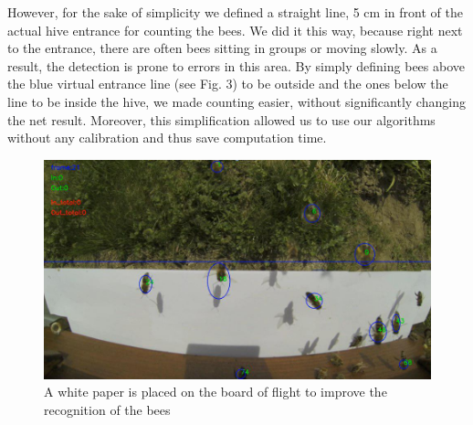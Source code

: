 \documentclass[10pt,twocolumn,letterpaper]{article}
\begin{document}
However, for the sake of simplicity we defined a straight line, 5 cm in front of the actual hive entrance for counting the bees. We did it this way, because right next to the entrance, there are often bees sitting in groups or moving slowly. As a result, the detection is prone to errors in this area. By simply defining bees above the blue virtual entrance line (see Fig. 3) to be outside and the ones below the line to be inside the hive, we made counting easier, without significantly changing the net result. Moreover, this simplification allowed us to use our algorithms without any calibration and thus save computation time.

\begin{figure}[h!]
\centering
\includegraphics[scale=0.26]{pictures/ph.jpg}
\caption{A white paper is placed on the board of flight to improve the recognition of the bees}
\end{figure}

\end{document}
